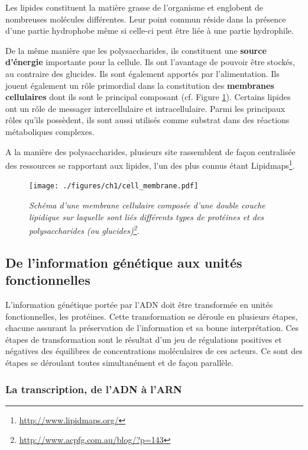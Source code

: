 Les lipides constituent la matière grasse de l'organisme et englobent de nombreuses molécules différentes. Leur point commun réside dans la présence d'une partie hydrophobe même si celle-ci peut être liée à une partie hydrophile.

De la même manière que les polysaccharides, ils constituent une \textbf{source d'énergie} importante pour la cellule. Ils ont l'avantage de pouvoir être stockés, au contraire des glucides. Ils sont également apportés par l'alimentation.
Ils jouent également un rôle primordial dans la constitution des \textbf{membranes cellulaires} dont ils sont le principal composant (cf. Figure \ref{Fig:cell_membrane}).
Certains lipides ont un rôle de messager intercellulaire et intracellulaire.
Parmi les principaux rôles qu'ils possèdent, ils sont aussi utilisés comme substrat dans des réactions métaboliques complexes.

A la manière des polysaccharides, plusieurs site rassemblent de façon centralisée des ressources se rapportant aux lipides, l'un des plus connus étant Lipidmaps\footnote{\url{http://www.lipidmaps.org/}}.

\begin{figure}[htb]
  \centering
  {\texttt{[image: ./figures/ch1/cell\_membrane.pdf]}}
    \caption[Schéma d'une membrane cellulaire.]{\it Schéma d'une membrane cellulaire composée d'une double couche lipidique sur laquelle sont liés différents types de protéines et des polysaccharides (ou glucides)\footnote{\url{http://www.acpfg.com.au/blog/?p=143}}.}
    \label{Fig:cell_membrane}
  \hspace{0.2cm}
\end{figure}


\subsection{De l'information génétique aux unités fonctionnelles} \label{trans_trad}

L'information génétique portée par l'ADN doit être transformée en unités fonctionnelles, les protéines. Cette transformation  se déroule en plusieurs étapes, chacune assurant la préservation de l'information et sa bonne interprétation. Ces étapes de transformation sont le résultat d'un jeu de régulations positives et négatives des équilibres de concentrations moléculaires de ces acteurs. Ce sont des étapes se déroulant toutes simultanément et de façon parallèle.

\subsubsection{La transcription, de l'ADN à l'ARN}

